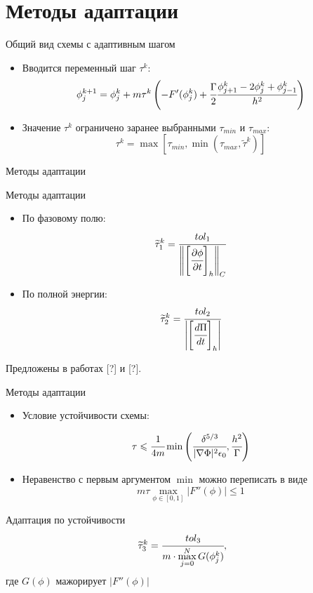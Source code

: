 
\section{Методы адаптации}

\begin{frame}{Общий вид схемы с адаптивным шагом}
\begin{itemize}
	\item Вводится переменный шаг $\tau^k$:
	\[
		\phi_j^{k + 1} = \phi_j^k + m \tau^k \left( -F'(\phi_j^k) + \cfrac{\Gamma}{2} \cfrac{{\phi}_{j + 1}^k - 2 {\phi}_j^k + {\phi}_{j - 1}^k}{h^2} \right)
	\]
	\item Значение $\tau^k$ ограничено заранее выбранными $\tau_{min}$ и $\tau_{max}$:
	\[
		\tau^k = \max \left[ \tau_{min}, \min( \tau_{max}, \widetilde{\tau}^k) \right]
	\]
\end{itemize}
\end{frame}


\begin{frame}{Методы адаптации}
\vspace{-0.7cm}
\begin{block}{Методы адаптации}
	\begin{itemize}
		\item По фазовому полю:
		\[
			\widetilde{\tau}_1^k = \cfrac{tol_1}{\left\| \left[ \cfrac{\partial \phi}{\partial t} \right]_h \right\|_C}
		\]
		\item По полной энергии:
		\[
			\widetilde{\tau}_2^k = \cfrac{tol_2}{\left| \left[ \cfrac{d \Pi}{dt} \right]_h \right|}
		\]
	\end{itemize}
\end{block}
Предложены в работах [?] и [?].
\end{frame}

{\nologo
\begin{frame}{Методы адаптации}
\vspace{-0.6cm}
\begin{itemize}
	\item Условие устойчивости схемы:
	\vspace{-0.3cm}

	\[
		\tau \leqslant \cfrac{1}{4m} \min \left( \cfrac{\delta^{5/3}}{|\nabla \Phi|^2 \epsilon_0}, \cfrac{h^2}{\Gamma} \right)
	\]
	\vspace{-0.3cm}
	\item Неравенство с первым аргументом $\min$ можно переписать в виде
	\[
		m \tau \max\limits_{\phi \in [0, 1]} |F''(\phi)| \leqslant 1
	\]
\end{itemize}
\vspace{-0.3cm}
\begin{block}{Адаптация по устойчивости}
	\[
		\widetilde{\tau}_3^k = \cfrac{tol_3}{m \cdot \max\limits_{j = 0}^N G(\phi_j^k)},
	\]
	где $G(\phi)$ мажорирует $|F''(\phi)|$
\end{block}
\end{frame}
}